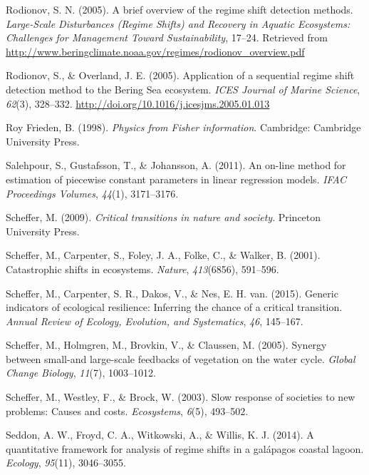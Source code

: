 \documentclass[12pt,twoside,openany]{reedthesis}
\begin{document}
\leavevmode\hypertarget{ref-rodionov_brief_2005}{}%
Rodionov, S. N. (2005). A brief overview of the regime shift detection methods. \emph{Large-Scale Disturbances (Regime Shifts) and Recovery in Aquatic Ecosystems: Challenges for Management Toward Sustainability}, 17--24. Retrieved from \url{http://www.beringclimate.noaa.gov/regimes/rodionov_overview.pdf}

\leavevmode\hypertarget{ref-rodionov_application_2005}{}%
Rodionov, S., \& Overland, J. E. (2005). Application of a sequential regime shift detection method to the Bering Sea ecosystem. \emph{ICES Journal of Marine Science}, \emph{62}(3), 328--332. \url{http://doi.org/10.1016/j.icesjms.2005.01.013}

\leavevmode\hypertarget{ref-roy_frieden_physics_1998}{}%
Roy Frieden, B. (1998). \emph{Physics from Fisher information}. Cambridge: Cambridge University Press.

\leavevmode\hypertarget{ref-salehpour2011line}{}%
Salehpour, S., Gustafsson, T., \& Johansson, A. (2011). An on-line method for estimation of piecewise constant parameters in linear regression models. \emph{IFAC Proceedings Volumes}, \emph{44}(1), 3171--3176.

\leavevmode\hypertarget{ref-scheffer_critical_2009}{}%
Scheffer, M. (2009). \emph{Critical transitions in nature and society}. Princeton University Press.

\leavevmode\hypertarget{ref-scheffer_catastrophic_2001}{}%
Scheffer, M., Carpenter, S., Foley, J. A., Folke, C., \& Walker, B. (2001). Catastrophic shifts in ecosystems. \emph{Nature}, \emph{413}(6856), 591--596.

\leavevmode\hypertarget{ref-scheffer2015generic}{}%
Scheffer, M., Carpenter, S. R., Dakos, V., \& Nes, E. H. van. (2015). Generic indicators of ecological resilience: Inferring the chance of a critical transition. \emph{Annual Review of Ecology, Evolution, and Systematics}, \emph{46}, 145--167.

\leavevmode\hypertarget{ref-scheffer2005synergy}{}%
Scheffer, M., Holmgren, M., Brovkin, V., \& Claussen, M. (2005). Synergy between small-and large-scale feedbacks of vegetation on the water cycle. \emph{Global Change Biology}, \emph{11}(7), 1003--1012.

\leavevmode\hypertarget{ref-scheffer2003slow}{}%
Scheffer, M., Westley, F., \& Brock, W. (2003). Slow response of societies to new problems: Causes and costs. \emph{Ecosystems}, \emph{6}(5), 493--502.

\leavevmode\hypertarget{ref-seddon2014quantitative}{}%
Seddon, A. W., Froyd, C. A., Witkowski, A., \& Willis, K. J. (2014). A quantitative framework for analysis of regime shifts in a galápagos coastal lagoon. \emph{Ecology}, \emph{95}(11), 3046--3055.
\end{document}
